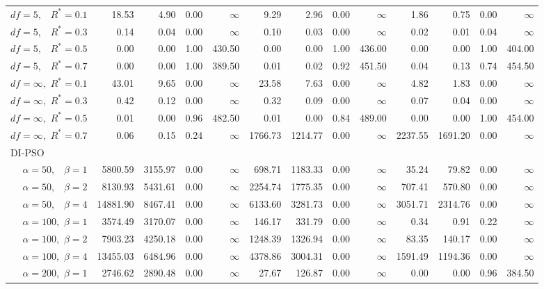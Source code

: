 \documentclass[12pt]{article}
\begin{document}
\begin{table}[ht]
{\begin{tabular}{r|rrrr|rrrr|rrrr}
  $df = 5,\enspace$ $R^* =0.1$ & 18.53 & 4.90 & 0.00 & $\infty$ & 9.29 & 2.96 & 0.00 & $\infty$ & 1.86 & 0.75 & 0.00 & $\infty$ \\ 
  $df = 5,\enspace$ $R^* =0.3$ & 0.14 & 0.04 & 0.00 & $\infty$ & 0.10 & 0.03 & 0.00 & $\infty$ & 0.02 & 0.01 & 0.04 & $\infty$ \\ 
  $df = 5,\enspace$ $R^* =0.5$ & 0.00 & 0.00 & 1.00 & 430.50 & 0.00 & 0.00 & 1.00 & 436.00 & 0.00 & 0.00 & 1.00 & 404.00 \\ 
  $df = 5,\enspace$ $R^* =0.7$ & 0.00 & 0.00 & 1.00 & 389.50 & 0.01 & 0.02 & 0.92 & 451.50 & 0.04 & 0.13 & 0.74 & 454.50 \\ 
  $df = \infty,$ $R^* =0.1$ & 43.01 & 9.65 & 0.00 & $\infty$ & 23.58 & 7.63 & 0.00 & $\infty$ & 4.82 & 1.83 & 0.00 & $\infty$ \\ 
  $df = \infty,$ $R^* =0.3$ & 0.42 & 0.12 & 0.00 & $\infty$ & 0.32 & 0.09 & 0.00 & $\infty$ & 0.07 & 0.04 & 0.00 & $\infty$ \\ 
  $df = \infty,$ $R^* =0.5$ & 0.01 & 0.00 & 0.96 & 482.50 & 0.01 & 0.00 & 0.84 & 489.00 & 0.00 & 0.00 & 1.00 & 454.00 \\ 
  $df = \infty,$ $R^* =0.7$ & 0.06 & 0.15 & 0.24 & $\infty$ & 1766.73 & 1214.77 & 0.00 & $\infty$ & 2237.55 & 1691.20 & 0.00 & $\infty$ \\ 
\hline
\multicolumn{1}{l|}{DI-PSO} &&&&&&&&&&&&\\
  $\alpha = 50,\enspace$ $\beta =1$ & 5800.59 & 3155.97 & 0.00 & $\infty$ & 698.71 & 1183.33 & 0.00 & $\infty$ & 35.24 & 79.82 & 0.00 & $\infty$ \\ 
  $\alpha = 50,\enspace$ $\beta =2$ & 8130.93 & 5431.61 & 0.00 & $\infty$ & 2254.74 & 1775.35 & 0.00 & $\infty$ & 707.41 & 570.80 & 0.00 & $\infty$ \\ 
  $\alpha = 50,\enspace$ $\beta =4$ & 14881.90 & 8467.41 & 0.00 & $\infty$ & 6133.60 & 3281.73 & 0.00 & $\infty$ & 3051.71 & 2314.76 & 0.00 & $\infty$ \\ 
  $\alpha = 100,$ $\beta =1$ & 3574.49 & 3170.07 & 0.00 & $\infty$ & 146.17 & 331.79 & 0.00 & $\infty$ & 0.34 & 0.91 & 0.22 & $\infty$ \\ 
  $\alpha = 100,$ $\beta =2$ & 7903.23 & 4250.18 & 0.00 & $\infty$ & 1248.39 & 1326.94 & 0.00 & $\infty$ & 83.35 & 140.17 & 0.00 & $\infty$ \\ 
  $\alpha = 100,$ $\beta =4$ & 13455.03 & 6484.96 & 0.00 & $\infty$ & 4378.86 & 3004.31 & 0.00 & $\infty$ & 1591.49 & 1194.36 & 0.00 & $\infty$ \\ 
  $\alpha = 200,$ $\beta =1$ & 2746.62 & 2890.48 & 0.00 & $\infty$ & 27.67 & 126.87 & 0.00 & $\infty$ & 0.00 & 0.00 & 0.96 & 384.50 \\ 

\end{tabular}}
\end{table}
\end{document}
